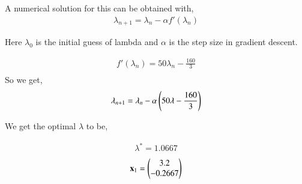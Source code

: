 \documentclass[journal,12pt,twocolumn]{IEEEtran}
\renewcommand\thesection{\arabic{section}}
\begin{document}
\begin{enumerate}
A numerical solution for this can be obtained with,
		\begin{align}
			\lambda_{n+1} = \lambda_n - \alpha f'(\lambda_n)
		\end{align}

Here $\lambda_0$ is the initial guess of lambda and $\alpha$ is the step size in gradient descent.

		\begin{align}
			f'(\lambda_n) = 50\lambda_n-\frac{160}{3}\\
		\end{align}
So we get,
		\begin{align}
			\lambda_{n+1} = \lambda_n - \alpha \left(50\lambda-\frac{160}{3}\right) 
		\end{align}

We get the optimal $\lambda$ to be,

		\begin{align}
			\lambda^* = 1.0667
		\end{align}
\begin{align}
	\mathbf{x}_1 = \begin{pmatrix}3.2\\-0.2667\end{pmatrix}
\end{align}
		\begin{table}[h]
			\centering
			
			\caption{}
			\label{tab:2}
		\end{table}

\end{enumerate}

%
\end{document}
